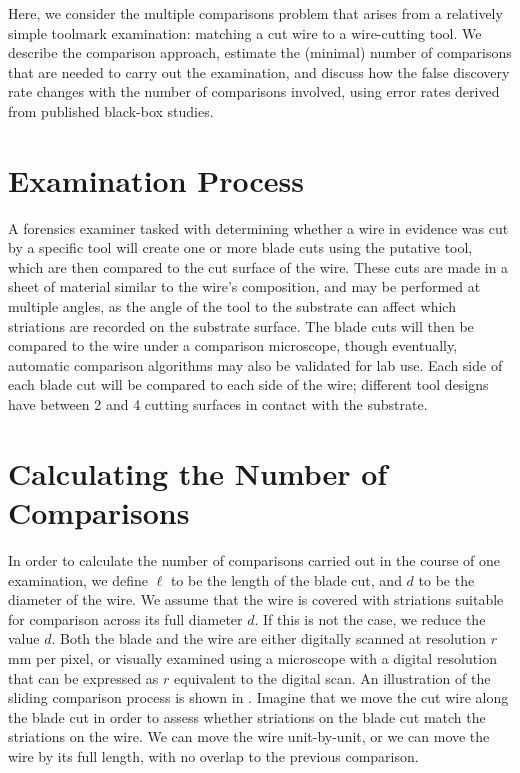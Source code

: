 \documentclass[9pt,twocolumn,twoside]{pnas-new}\usepackage[]{graphicx}\usepackage[dvipsnames]{xcolor}
\newcommand{\svp}[1]{{\textcolor{RedOrange}{#1}}}
\begin{document}
Here, we consider the multiple comparisons problem that arises from a relatively simple toolmark examination: matching a cut wire to a wire-cutting tool.
We describe the comparison approach, estimate the (minimal) number of comparisons that are needed to carry out the examination, and discuss how the false discovery rate changes with the number of comparisons involved, using error rates derived from published black-box studies.


\section*{Examination Process}

A forensics examiner tasked with determining whether a wire in evidence was cut by a specific tool will create one or more blade cuts using the putative tool, which are then compared to the cut surface of the wire.
These cuts are made in a sheet of material similar to the wire's composition, and may be performed at multiple angles, as the angle of the tool to the substrate can affect which striations are recorded on the substrate surface.
The blade cuts will then be compared to the wire under a comparison microscope, though eventually, automatic comparison algorithms may also be validated for lab use.
Each side of each blade cut will be compared to each side of the wire;
\svp{different tool designs have between 2 and 4 cutting surfaces in contact with the substrate.}

\section*{Calculating the Number of Comparisons}

In order to calculate the number of comparisons carried out in the course of one examination, we define $\ell$ to be the length of the blade cut, and $d$ to be the diameter of the wire.
We assume that the wire is covered with striations suitable for comparison across its full diameter $d$.
If this is not the case, we reduce the value $d$.
Both the blade and the wire are either digitally scanned at resolution $r$ mm per pixel, or visually examined using a microscope with a digital resolution that can be expressed as $r$ equivalent to the digital scan.
An illustration of the sliding comparison process is shown in .
Imagine that we move the cut wire along the blade cut in order to assess whether striations on the blade cut match the striations on the wire.
We can move the wire unit-by-unit, or we can move the wire by its full length, with no overlap to the previous comparison.
\end{document}
